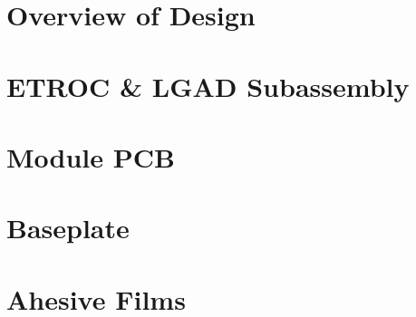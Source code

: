 \documentclass[10pt]{datasheet}
\begin{document}
\onecolumn

\section{Overview of Design}

\section{ETROC \& LGAD Subassembly}

\section{Module PCB}

\section{Baseplate}

\section{Ahesive Films}
\end{document}
